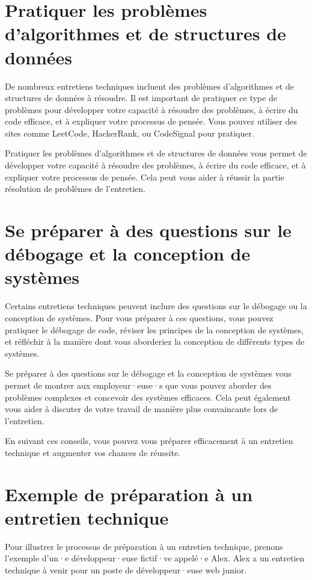 \section{Pratiquer les problèmes d'algorithmes et de structures de données}

De nombreux entretiens techniques incluent des problèmes d'algorithmes et de structures de données à résoudre. Il est important de pratiquer ce type de problèmes pour développer votre capacité à résoudre des problèmes, à écrire du code efficace, et à expliquer votre processus de pensée. Vous pouvez utiliser des sites comme LeetCode, HackerRank, ou CodeSignal pour pratiquer.

Pratiquer les problèmes d'algorithmes et de structures de données vous permet de développer votre capacité à résoudre des problèmes, à écrire du code efficace, et à expliquer votre processus de pensée. Cela peut vous aider à réussir la partie résolution de problèmes de l'entretien.

\section{Se préparer à des questions sur le débogage et la conception de systèmes}

Certains entretiens techniques peuvent inclure des questions sur le débogage ou la conception de systèmes. Pour vous préparer à ces questions, vous pouvez pratiquer le débogage de code, réviser les principes de la conception de systèmes, et réfléchir à la manière dont vous aborderiez la conception de différents types de systèmes.

Se préparer à des questions sur le débogage et la conception de systèmes vous permet de montrer aux employeur·euse·s que vous pouvez aborder des problèmes complexes et concevoir des systèmes efficaces. Cela peut également vous aider à discuter de votre travail de manière plus convaincante lors de l'entretien.

En suivant ces conseils, vous pouvez vous préparer efficacement à un entretien technique et augmenter vos chances de réussite.

\section{Exemple de préparation à un entretien technique}

Pour illustrer le processus de préparation à un entretien technique, prenons l'exemple d'un·e développeur·euse fictif·ve appelé·e Alex. Alex a un entretien technique à venir pour un poste de développeur·euse web junior.

